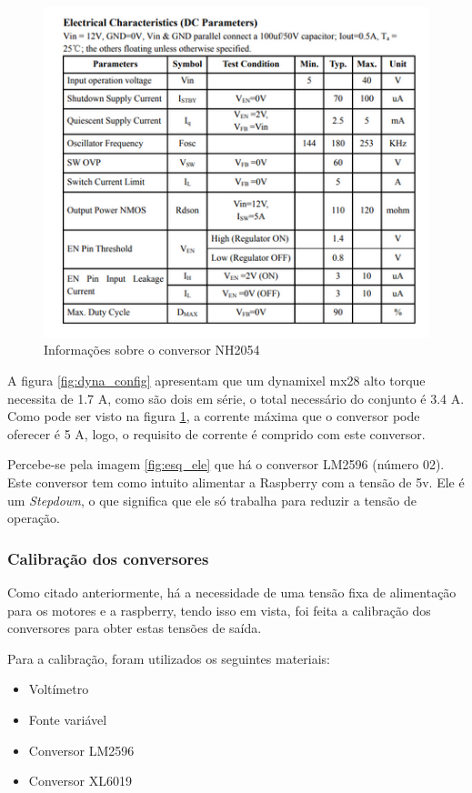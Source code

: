     \begin{figure}[H]
    	\centering
    	\includegraphics[scale=0.7, angle=0]{Figures/NH2054_2.png}
    	\caption{Informações sobre o conversor NH2054}
    	\label{fig:nh2054_2}
    \end{figure}
    
A figura \ref{fig:dyna_config} apresentam que um dynamixel mx28 alto torque necessita de 1.7 A, como são dois em série, o total necessário do conjunto é 3.4 A. Como pode ser visto na figura \ref{fig:nh2054_2}, a corrente máxima que o conversor pode oferecer é 5 A, logo, o requisito de corrente é comprido com este conversor.

Percebe-se pela imagem \ref{fig:esq_ele} que há o conversor LM2596 (número 02). Este conversor tem como intuito alimentar a Raspberry com a tensão de 5v. Ele é um \textit{Stepdown}, o que significa que ele só trabalha para reduzir a tensão de operação. 

\subsubsection{Calibração dos conversores}
Como citado anteriormente, há a necessidade de uma tensão fixa de alimentação para os motores e a raspberry, tendo isso em vista, foi feita a calibração dos conversores para obter estas tensões de saída. 

Para a calibração, foram utilizados os seguintes materiais:

\begin{itemize}
	\item Voltímetro
	\item Fonte variável
	\item Conversor LM2596
	\item Conversor XL6019		
\end{itemize}

